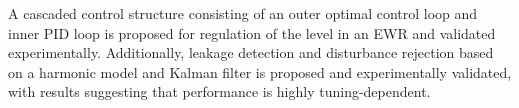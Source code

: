 A cascaded control structure consisting of an outer optimal control loop and inner PID loop is proposed for regulation of the level in an EWR and validated experimentally. Additionally, leakage detection and disturbance rejection based on a harmonic model and Kalman filter is proposed and experimentally validated, with results suggesting that performance is highly tuning-dependent.